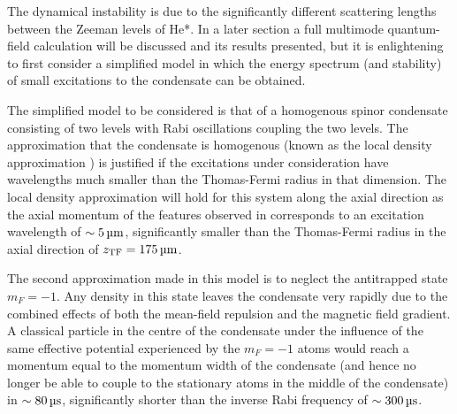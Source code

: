 The dynamical instability is due to the significantly different scattering lengths between the Zeeman levels of He*. In a later section a full multimode quantum-field calculation will be discussed and its results presented, but it is enlightening to first consider a simplified model in which the energy spectrum (and stability) of small excitations to the condensate can be obtained.

The simplified model to be considered is that of a homogenous spinor condensate consisting of two levels with Rabi oscillations coupling the two levels. The approximation that the condensate is homogenous (known as the local density approximation \cite{Stamper-Kurn:1999,Zambelli:2000}) is justified if the excitations under consideration have wavelengths much smaller than the Thomas-Fermi radius in that dimension. The local density approximation will hold for this system along the axial direction as the axial momentum of the features observed in  corresponds to an excitation wavelength of $\sim \unit[5]{\micro m}$, significantly smaller than the Thomas-Fermi radius in the axial direction of $z_\text{TF} = \unit[175]{\micro m}$. 

The second approximation made in this model is to neglect the antitrapped state $m_F=-1$. Any density in this state leaves the condensate very rapidly due to the combined effects of both the mean-field repulsion and the magnetic field gradient. A classical particle in the centre of the condensate under the influence of the same effective potential experienced by the $m_F=-1$ atoms would reach a momentum equal to the momentum width of the condensate (and hence no longer be able to couple to the stationary atoms in the middle of the condensate) in $\sim\unit[80]{\micro s}$, significantly shorter than the inverse Rabi frequency of $\sim \unit[300]{\micro s}$.

